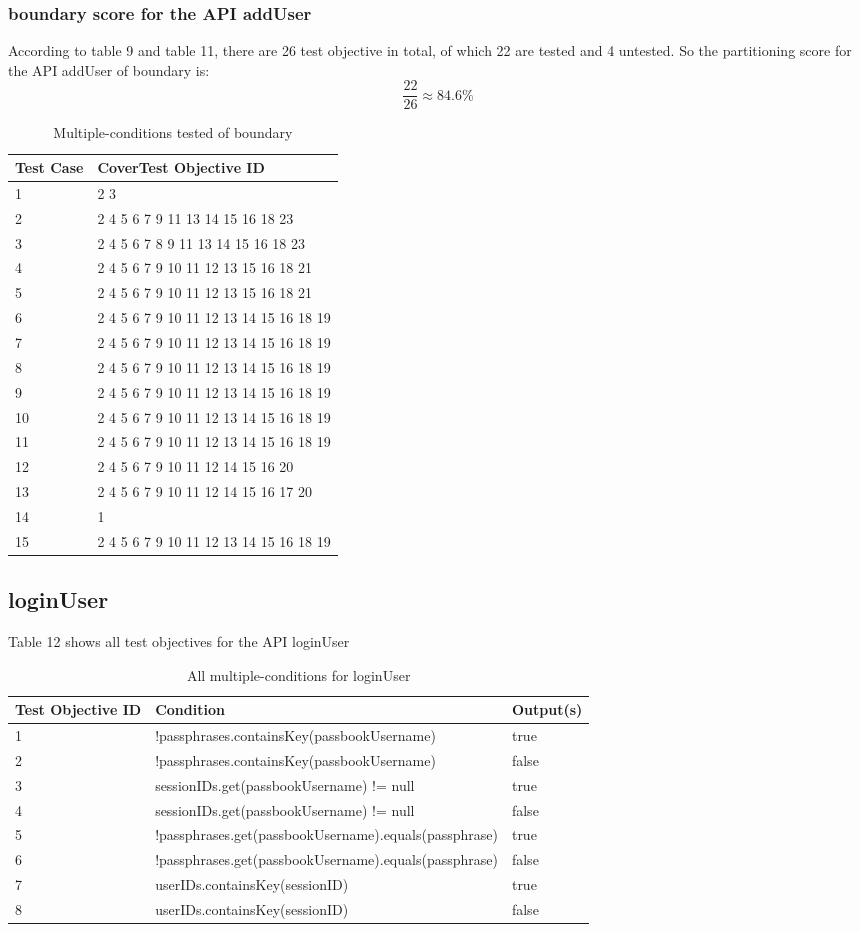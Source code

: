 \documentclass{article}
\begin{document}
\subsubsection{boundary score for the API addUser}
According to table 9 and table 11, there are 26 test objective in total, of which 22 are tested and 4 untested. So the partitioning score for the API addUser of boundary is:
$$\frac{22}{26}\approx84.6\%$$
\begin{longtable}{|p{2cm}|p{8cm}|}
\caption{Multiple-conditions tested of boundary}\\
\hline 
Test Case& CoverTest Objective ID\\
\hline  
1&2 3\\
\hline
2&2 4 5 6 7 9 11 13 14 15 16 18 23\\
\hline
3&2 4 5 6 7 8 9 11 13 14 15 16 18 23\\
\hline
4&2 4 5 6 7 9 10 11 12 13 15 16 18 21\\
\hline
5&2 4 5 6 7 9 10 11 12 13 15 16 18 21\\
\hline
6&2 4 5 6 7 9 10 11 12 13 14 15 16 18 19\\
\hline
7&2 4 5 6 7 9 10 11 12 13 14 15 16 18 19\\
\hline
8&2 4 5 6 7 9 10 11 12 13 14 15 16 18 19\\
\hline
9&2 4 5 6 7 9 10 11 12 13 14 15 16 18 19\\
\hline
10&2 4 5 6 7 9 10 11 12 13 14 15 16 18 19\\
\hline
11&2 4 5 6 7 9 10 11 12 13 14 15 16 18 19\\
\hline
12&2 4 5 6 7 9 10 11 12 14 15 16 20\\
\hline
13&2 4 5 6 7 9 10 11 12 14 15 16 17 20\\
\hline
14&1\\
\hline
15&2 4 5 6 7 9 10 11 12 13 14 15 16 18 19\\
\hline
\end{longtable}

\subsection{loginUser}
Table 12 shows all test objectives for the API loginUser
\begin{longtable}{|p{2cm}|p{10cm}|p{3cm}|}
\caption{All multiple-conditions for loginUser}\\
\hline 
Test Objective ID&Condition&Output(s)\\
\hline  
1&!passphrases.containsKey(passbookUsername)&true\\
\hline
2&!passphrases.containsKey(passbookUsername)&false\\
\hline
3&sessionIDs.get(passbookUsername) != null&true\\
\hline
4&sessionIDs.get(passbookUsername) != null&false\\
\hline
5&!passphrases.get(passbookUsername).equals(passphrase)&true\\
\hline
6&!passphrases.get(passbookUsername).equals(passphrase)&false\\
\hline
7&userIDs.containsKey(sessionID)&true\\
\hline
8&userIDs.containsKey(sessionID)&false\\
\hline
\end{longtable}
\end{document}
